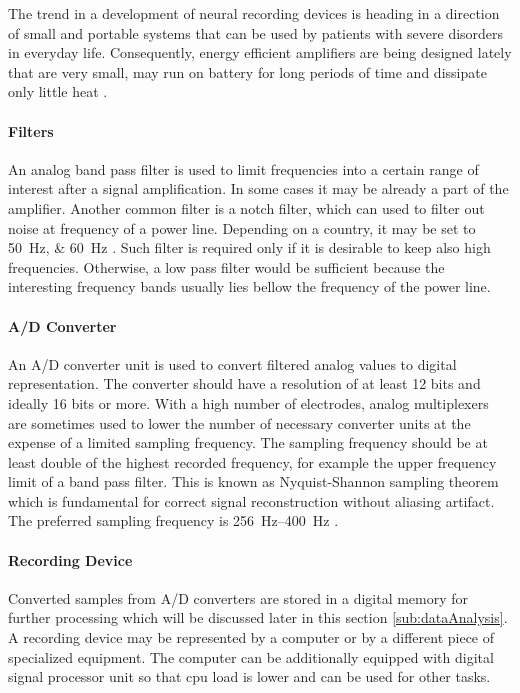 The trend in a development of neural recording devices is heading in a direction of
small and portable systems that can be used by patients with severe disorders in everyday life.
Consequently, energy efficient amplifiers are being designed lately that are very small, may run on battery for
long periods of time and dissipate only little heat \cite{neuralAmp}.

\paragraph{Filters}
An analog band pass filter is used to limit frequencies into a certain range of
interest after a signal amplification. In some cases it may be already a part of the amplifier.
Another common filter is a notch filter, which can used to filter out noise
at frequency of a power line. Depending on a country, it may be set to
\SIlist[list-units = single, list-pair-separator = { or }]{50;60}{\Hz}
\cite{deltaCompNREM}. Such filter is required only if it is desirable to keep also
high frequencies. Otherwise, a low pass filter would be sufficient because the interesting frequency bands usually lies bellow the frequency of the power line.

\paragraph{A/D Converter}
An A/D converter unit is used to convert filtered analog values to digital
representation. The converter should have a resolution of at least 12 bits and
ideally 16 bits or more. With a high number of electrodes, analog multiplexers are
sometimes used to lower the number of necessary converter units at the expense
of a limited sampling frequency. The sampling frequency should be at least double of
the highest recorded frequency, for example the upper frequency limit of a
band pass filter. This is known as Nyquist-Shannon sampling theorem which is
fundamental for correct signal reconstruction without aliasing artifact. The
preferred sampling frequency is \SIrange{256}{400}{\Hz} \cite{guidDigEEG}.

\paragraph{Recording Device}
Converted samples from A/D converters are stored in a digital memory for further
processing which will be discussed later in this section \ref{sub:dataAnalysis}.
A recording device may be represented by a computer or by a
different piece of specialized equipment. The computer can be additionally
equipped with digital signal processor unit so that \gls{cpu} load is lower and can be
used for other tasks.

